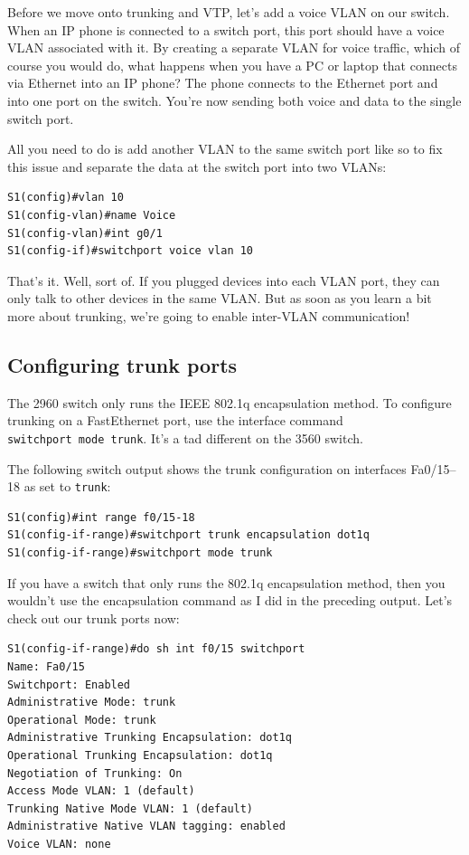 Before we move onto trunking and VTP, let's add a voice VLAN on our
switch. When an IP phone is connected to a switch port, this port should
have a voice VLAN associated with it. By creating a separate VLAN for
voice traffic, which of course you would do, what happens when you have
a PC or laptop that connects via Ethernet into an IP phone? The phone
connects to the Ethernet port and into one port on the switch. You're
now sending both voice and data to the single switch port.

All you need to do is add another VLAN to the same switch port like so
to fix this issue and separate the data at the switch port into two
VLANs:

\begin{verbatim}
S1(config)#vlan 10
S1(config-vlan)#name Voice
S1(config-vlan)#int g0/1
S1(config-if)#switchport voice vlan 10
\end{verbatim}

That's it. Well, sort of. If you plugged devices into each VLAN port,
they can only talk to other devices in the same VLAN. But as soon as you
learn a bit more about trunking, we're going to enable inter-VLAN
communication!

\subsection{Configuring trunk ports}

The 2960 switch only runs the IEEE 802.1q encapsulation method. To
configure trunking on a FastEthernet port, use the interface command
\texttt{switchport\ mode\ trunk}. It's a tad different on the 3560
switch.

The following switch output shows the trunk configuration on interfaces
Fa0/15--18 as set to \texttt{trunk}:

\begin{verbatim}
S1(config)#int range f0/15-18
S1(config-if-range)#switchport trunk encapsulation dot1q
S1(config-if-range)#switchport mode trunk
\end{verbatim}

If you have a switch that only runs the 802.1q encapsulation method, then you wouldn't use
the encapsulation command as I did in the preceding output. Let's check
out our trunk ports now:

\begin{verbatim}
S1(config-if-range)#do sh int f0/15 switchport
Name: Fa0/15
Switchport: Enabled
Administrative Mode: trunk
Operational Mode: trunk
Administrative Trunking Encapsulation: dot1q
Operational Trunking Encapsulation: dot1q
Negotiation of Trunking: On
Access Mode VLAN: 1 (default)
Trunking Native Mode VLAN: 1 (default)
Administrative Native VLAN tagging: enabled
Voice VLAN: none
\end{verbatim}


